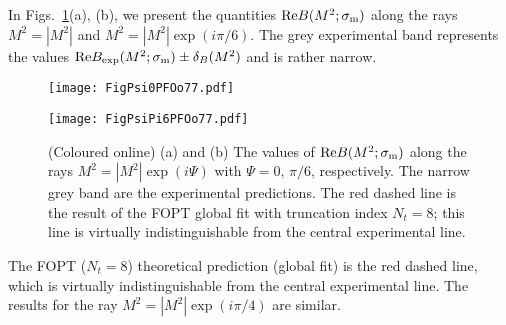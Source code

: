 \documentclass[aps,nofootinbib,showkeys,noshowpacs,preprintnumbers,amsmath,amssymb]{revtex4}
\newcommand{\sm}{{\sigma_{\rm m}}}
\begin{document}
In Figs.~\ref{FigPsiPFO}(a), (b), we present the quantities ${\rm Re} B(M^2;\sm)$ along the rays $M^2 = |M^2|$ and $M^2= |M^2| \exp(i \pi/6)$. The grey experimental band represents the values ${\rm Re} B_{\rm exp}(M^2;\sm) \pm  \delta_B(M^2)$ and is rather narrow.
\begin{figure}[htb] 
\begin{minipage}[b]{.49\linewidth}
  \centering\texttt{[image: FigPsi0PFOo77.pdf]}
  \end{minipage} 
\begin{minipage}[b]{.49\linewidth}
  \centering\texttt{[image: FigPsiPi6PFOo77.pdf]}
\end{minipage}
\vspace{-0.2cm}
\caption{\footnotesize  (Coloured online) (a) and (b) The values of ${\rm Re} B(M^2;\sm)$ along the rays $M^2=|M^2| \exp( i \Psi)$ with $\Psi=0$, $\pi/6$, respectively. The narrow grey band are the experimental predictions. The red dashed line is the result of the FOPT global fit with truncation index $N_t=8$; this line is virtually indistinguishable from the central experimental line.}
\label{FigPsiPFO}
\end{figure}
The FOPT ($N_t=8$) theoretical prediction (global fit) is the red dashed line, which is virtually indistinguishable from the central experimental line. The results for the ray  $M^2= |M^2| \exp(i \pi/4)$ are similar.
\end{document}
